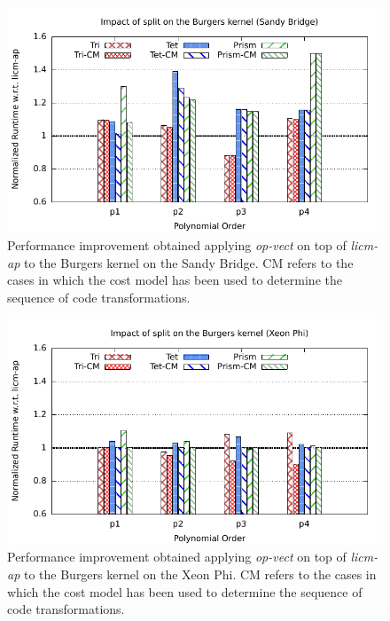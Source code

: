 \documentclass[conference]{IEEEtran}
\begin{document}
\begin{figure}[h]
\begin{center}
\includegraphics[scale=0.65]{Pictures/burgers-normalized-split.pdf}
\end{center}
\caption{Performance improvement obtained applying \emph{op-vect} on top of \emph{licm-ap} to the Burgers kernel on the Sandy Bridge. CM refers to the cases in which the cost model has been used to determine the sequence of code transformations.}
\label{fig:split-burgers-speedup}
\end{figure}

\begin{figure}[h]
\begin{center}
\includegraphics[scale=0.65]{Pictures/burgers-normalized-split-phi.pdf}
\end{center}
\caption{Performance improvement obtained applying \emph{op-vect} on top of \emph{licm-ap} to the Burgers kernel on the Xeon Phi. CM refers to the cases in which the cost model has been used to determine the sequence of code transformations.}
\label{fig:split-burgers-speedup-phi}
\end{figure}
\end{document}
